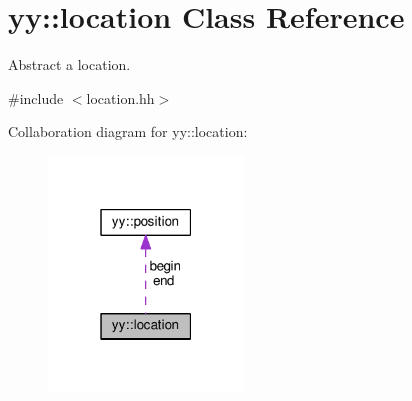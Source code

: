 \hypertarget{classyy_1_1location}{}\section{yy\+:\+:location Class Reference}
\label{classyy_1_1location}


Abstract a location.  




{\ttfamily \#include $<$location.\+hh$>$}



Collaboration diagram for yy\+:\+:location\+:\nopagebreak
\begin{figure}[H]
\begin{center}
\leavevmode
\includegraphics[width=147pt]{classyy_1_1location__coll__graph}
\end{center}
\end{figure}
